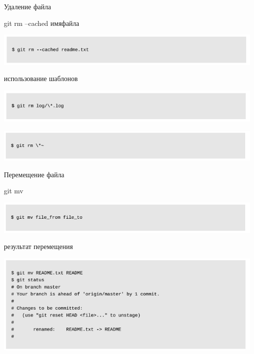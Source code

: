 \documentclass{beamer}
\begin{document}
\begin{frame}{Удаление файла}
\begin{block}{git rm --cached имяфайла}
\begin{center}
\includegraphics[scale=0.5]{images/rm-3.png}
\end{center}
\end{block}
\begin{block}{использование шаблонов}
\begin{center}
\includegraphics[scale=0.5]{images/rm-4.png}
\end{center}
\begin{center}
\includegraphics[scale=0.5]{images/rm-5.png}
\end{center}
\end{block}
\end{frame}

\begin{frame}{Перемещение файла}
\begin{block}{git mv}
\begin{center}
\includegraphics[scale=0.5]{images/mv-1.png}
\end{center}
\end{block}
\begin{block}{результат перемещения}
\begin{center}
\includegraphics[scale=0.5]{images/mv-2.png}
\end{center}
\end{block}
\end{frame}
\end{document}

